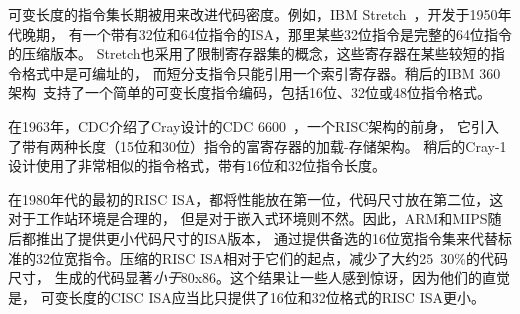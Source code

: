 \begin{commentary}
可变长度的指令集长期被用来改进代码密度。例如，IBM Stretch~\cite{stretch}，开发于1950年代晚期，
有一个带有32位和64位指令的ISA，那里某些32位指令是完整的64位指令的压缩版本。
Stretch也采用了限制寄存器集的概念，这些寄存器在某些较短的指令格式中是可编址的，
而短分支指令只能引用一个索引寄存器。稍后的IBM 360架构~\cite{ibm360}支持了一个简单的可变长度指令编码，包括16位、32位或48位指令格式。

在1963年，CDC介绍了Cray设计的CDC 6600~\cite{cdc6600}，一个RISC架构的前身，
它引入了带有两种长度（15位和30位）指令的富寄存器的加载-存储架构。
稍后的Cray-1设计使用了非常相似的指令格式，带有16位和32位指令长度。

在1980年代的最初的RISC ISA，都将性能放在第一位，代码尺寸放在第二位，这对于工作站环境是合理的，
但是对于嵌入式环境则不然。因此，ARM和MIPS随后都推出了提供更小代码尺寸的ISA版本，
通过提供备选的16位宽指令集来代替标准的32位宽指令。压缩的RISC ISA相对于它们的起点，减少了大约25~30\%的代码尺寸，
生成的代码显著\emph{小于}80x86。这个结果让一些人感到惊讶，因为他们的直觉是，
可变长度的CISC ISA应当比只提供了16位和32位格式的RISC ISA更小。


\end{commentary}
